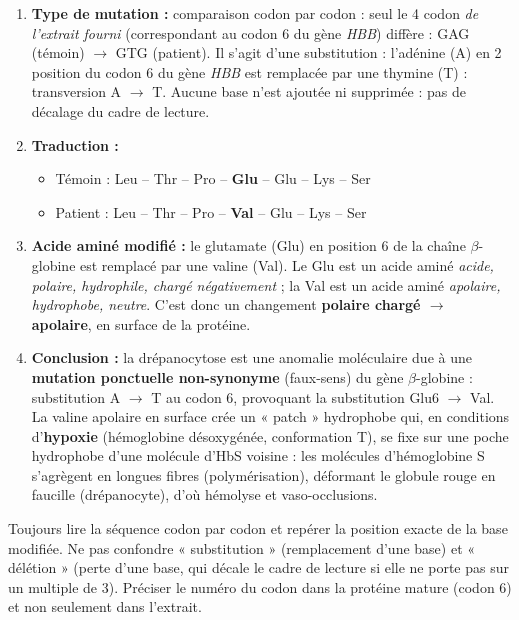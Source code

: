\documentclass[11pt]{article}
\newcommand{\cle}[1]{{\popxbold\color{popdark}#1}}
\begin{document}
\begin{corrige}
\begin{enumerate}
    \item \textbf{Type de mutation :} comparaison codon par codon : seul le 4 codon \emph{de l'extrait fourni} (correspondant au codon 6 du gène \emph{HBB}) diffère : GAG (témoin) $\to$ GTG (patient). Il s'agit d'une \cle{substitution} : l'adénine (A) en 2 position du codon 6 du gène \emph{HBB} est remplacée par une thymine (T) : transversion A $\to$ T. Aucune base n'est ajoutée ni supprimée : pas de décalage du cadre de lecture.
    \item \textbf{Traduction :}
    \begin{itemize}
        \item Témoin : Leu -- Thr -- Pro -- \textbf{Glu} -- Glu -- Lys -- Ser
        \item Patient : Leu -- Thr -- Pro -- \textbf{Val} -- Glu -- Lys -- Ser
    \end{itemize}
    \item \textbf{Acide aminé modifié :} le glutamate (Glu) en position 6 de la chaîne $\beta$-globine est remplacé par une valine (Val). Le Glu est un acide aminé \emph{acide, polaire, hydrophile, chargé négativement} ; la Val est un acide aminé \emph{apolaire, hydrophobe, neutre}. C'est donc un changement \textbf{polaire chargé $\to$ apolaire}, en surface de la protéine.
    \item \textbf{Conclusion :} la drépanocytose est une anomalie moléculaire due à une \textbf{mutation ponctuelle non-synonyme} (faux-sens) du gène $\beta$-globine : substitution A $\to$ T au codon 6, provoquant la substitution Glu6 $\to$ Val. La valine apolaire en surface crée un « patch » hydrophobe qui, en conditions d'\textbf{hypoxie} (hémoglobine désoxygénée, conformation T), se fixe sur une poche hydrophobe d'une molécule d'HbS voisine : les molécules d'hémoglobine S s'agrègent en longues fibres (polymérisation), déformant le globule rouge en faucille (drépanocyte), d'où hémolyse et vaso-occlusions.
\end{enumerate}
\end{corrige}

\begin{attention}
Toujours lire la séquence codon par codon et repérer la position exacte de la base modifiée. Ne pas confondre « substitution » (remplacement d'une base) et « délétion » (perte d'une base, qui décale le cadre de lecture si elle ne porte pas sur un multiple de 3). Préciser le numéro du codon dans la protéine mature (codon 6) et non seulement dans l'extrait.
\end{attention}
\end{document}
